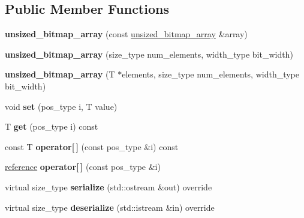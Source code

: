 \subsection*{Public Member Functions}
\begin{DoxyCompactItemize}
\item 
\mbox{\label{classdialog_1_1unsized__bitmap__array_a940998b89b7e061c39ea8720aa7b3b61}} 
{\bfseries unsized\+\_\+bitmap\+\_\+array} (const \hyperlink{classdialog_1_1unsized__bitmap__array}{unsized\+\_\+bitmap\+\_\+array} \&array)
\item 
\mbox{\label{classdialog_1_1unsized__bitmap__array_a849b479fd6e8c67ed680695d04f4cac0}} 
{\bfseries unsized\+\_\+bitmap\+\_\+array} (size\+\_\+type num\+\_\+elements, width\+\_\+type bit\+\_\+width)
\item 
\mbox{\label{classdialog_1_1unsized__bitmap__array_a2c7c8fa9c04b92259ce3fa1630fdd4f2}} 
{\bfseries unsized\+\_\+bitmap\+\_\+array} (T $\ast$elements, size\+\_\+type num\+\_\+elements, width\+\_\+type bit\+\_\+width)
\item 
\mbox{\label{classdialog_1_1unsized__bitmap__array_aad12c309b1d637d8c0a25546098cf717}} 
void {\bfseries set} (pos\+\_\+type i, T value)
\item 
\mbox{\label{classdialog_1_1unsized__bitmap__array_ac9dfbc9c10483e0f4d4943a0516a5f08}} 
T {\bfseries get} (pos\+\_\+type i) const
\item 
\mbox{\label{classdialog_1_1unsized__bitmap__array_a783d5378e0f0aa1e10c10f0108feefd0}} 
const T {\bfseries operator\mbox{[}$\,$\mbox{]}} (const pos\+\_\+type \&i) const
\item 
\mbox{\label{classdialog_1_1unsized__bitmap__array_ac3a92dbcf24be1eab76efcb3a5dd8d3a}} 
\hyperlink{classdialog_1_1value__reference}{reference} {\bfseries operator\mbox{[}$\,$\mbox{]}} (const pos\+\_\+type \&i)
\item 
\mbox{\label{classdialog_1_1unsized__bitmap__array_a3c6dfec187c0ecad49d562c2b081ec6a}} 
virtual size\+\_\+type {\bfseries serialize} (std\+::ostream \&out) override
\item 
\mbox{\label{classdialog_1_1unsized__bitmap__array_a4ae9d743033be4468f4c0be8dbaccbca}} 
virtual size\+\_\+type {\bfseries deserialize} (std\+::istream \&in) override
\end{DoxyCompactItemize}
